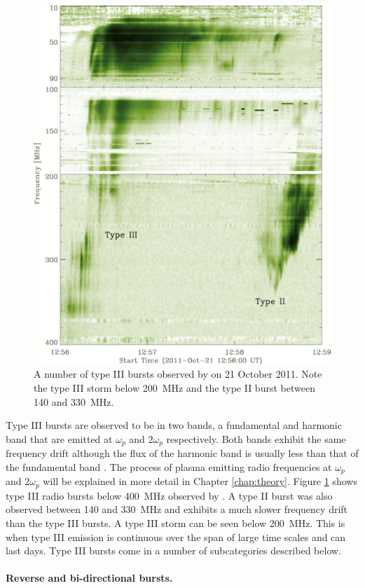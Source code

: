\begin{figure}[ht]
    \centering
    \includegraphics[width=0.75\columnwidth]{Images/Pietro_typeIII.png}
    \caption[A number of type III bursts observed by \cite{Zucca2012} on 21 October 2011.]{A number of type III bursts observed by \cite{Zucca2012} on 21 October 2011. Note the type III storm below 200~MHz and the type II burst between 140 and 330~MHz.}
    \label{fig:bursts}
\end{figure}

Type III bursts are observed to be in two bands, a fundamental and harmonic band that are emitted at $\omega_p$ and $2 \omega_p$ respectively. Both bands exhibit the same frequency drift although the flux of the harmonic band is usually less than that of the fundamental band \citep{Wild1954a, McLean1985}. The process of plasma emitting radio frequencies at $\omega_p$ and $2 \omega_p$ will be explained in more detail in Chapter \ref{chap:theory}. 
Figure \ref{fig:bursts} shows type III radio bursts below 400~MHz observed by \cite{Zucca2012}. A type II burst was also observed between 140 and 330~MHz and exhibits a much slower frequency drift than the type III bursts. A type III storm can be seen below 200~MHz. This is when type III emission is continuous over the span of large time scales and can last days. Type III bursts come in a number of subcategories described below.

\paragraph{Reverse and bi-directional bursts.}

